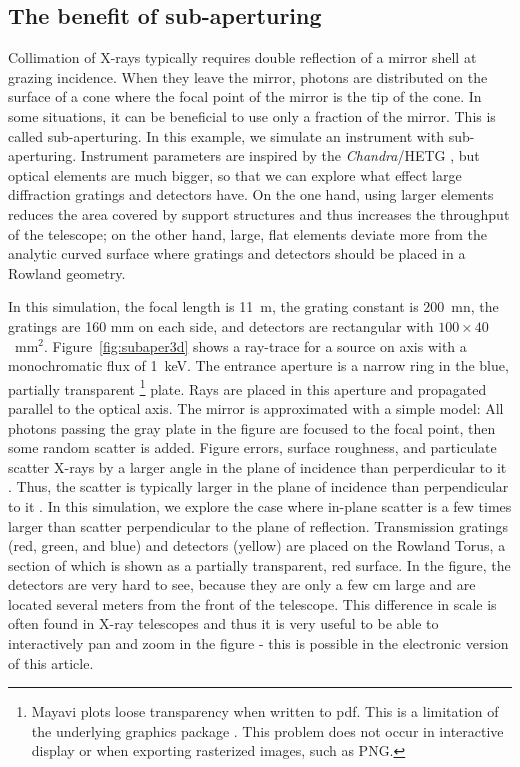 \documentclass[twocolumn]{aastex61}
\begin{document}
\subsection{The benefit of sub-aperturing}
Collimation of X-rays typically requires double reflection of a mirror
shell at grazing incidence. When they leave the mirror, photons are distributed
on the surface of a cone where the focal point of the mirror is the tip of the
cone. In some situations, it can be beneficial to use only a fraction of the mirror. This is called sub-aperturing. In this
example, we simulate an instrument with sub-aperturing. Instrument parameters
are inspired by the \emph{Chandra}/HETG \citep{2005PASP..117.1144C}, but
optical elements are much bigger, so that we can explore what effect large
diffraction gratings and detectors have. On the one hand, using larger elements
reduces the area covered by support structures and thus increases the
throughput of the telescope; on the other hand, large, flat elements deviate
more from the analytic curved surface where gratings and detectors should be
placed in a Rowland geometry.

In this simulation, the focal length is 11~m, the grating constant is 200~mn,
the gratings are 160 mm on each side, and detectors are rectangular with
$100\times40$~mm$^2$. Figure~\ref{fig:subaper3d} shows a ray-trace for a source
on axis with a monochromatic flux of 1~keV. The entrance aperture is a narrow
ring in the blue, partially transparent
\footnote{Mayavi plots loose transparency when written to pdf. This is a
  limitation of the underlying graphics package \citep[see discussion
    in][]{2016ApJ...818..115V}. This problem does not occur in interactive
  display or when exporting rasterized images, such as PNG.}
plate. Rays are
placed in this aperture and propagated parallel to the optical axis. The mirror
is approximated with a simple model: All photons passing the gray plate in the figure are
focused to the focal point, then some random scatter is added. Figure errors,
surface roughness, and particulate scatter X-rays by a larger angle in the
plane of incidence than perperdicular to it \citep{Cash:87}. Thus, the scatter
is typically larger in the plane of incidence than perpendicular to it
\citep{doi:10.1117/12.140551,doi:10.1117/12.2188988}. In this simulation, we
explore the case where in-plane scatter is a few times larger than scatter
perpendicular to the plane of reflection.  Transmission gratings (red, green,
and blue) and detectors (yellow) are placed on the Rowland Torus, a section of
which is shown as a partially transparent, red surface. In the figure, the
detectors are very hard to see, because they are only a few cm large and are
located several meters from the front of the telescope. This difference in
scale is often found in X-ray telescopes and thus it is very useful to be able
to interactively pan and zoom in the figure - this is possible in the
electronic version of this article.
\end{document}

